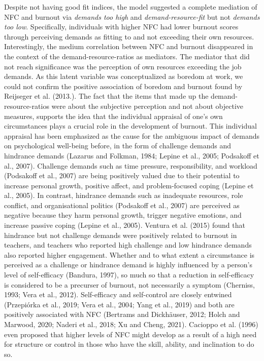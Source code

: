 \documentclass[
  english,
  man,floatsintext]{apa6}
\begin{document}
Despite not having good fit indices, the model suggested a complete mediation of NFC and burnout via \emph{demands too high} and \emph{demand-resource-fit} but not \emph{demands too low}.
Specifically, individuals with higher NFC had lower burnout scores through perceiving demands as fitting to and not exceeding their own resources.
Interestingly, the medium correlation between NFC and burnout disappeared in the context of the demand-resource-ratios as mediators.
The mediator that did not reach significance was the perception of own resources exceeding the job demands.
As this latent variable was conceptualized as boredom at work, we could not confirm the positive association of boredom and burnout found by Reijseger et al. (2013.).
The fact that the items that made up the demand-resource-ratios were about the subjective perception and not about objective measures, supports the idea that the individual appraisal of one's own circumstances plays a crucial role in the development of burnout.
This individual appraisal has been emphasized as the cause for the ambiguous impact of demands on psychological well-being before, in the form of challenge demands and hindrance demands (Lazarus and Folkman, 1984; Lepine et al., 2005; Podsakoff et al., 2007).
Challenge demands such as time pressure, responsibility, and workload (Podsakoff et al., 2007) are being positively valued due to their potential to increase personal growth, positive affect, and problem-focused coping (Lepine et al., 2005).
In contrast, hindrance demands such as inadequate resources, role conflict, and organisational politics (Podsakoff et al., 2007) are perceived as negative because they harm personal growth, trigger negative emotions, and increase passive coping (Lepine et al., 2005).
Ventura et al. (2015) found that hindrance but not challenge demands were positively related to burnout in teachers, and teachers who reported high challenge and low hindrance demands also reported higher engagement.
Whether and to what extent a circumstance is perceived as a challenge or hindrance demand is highly influenced by a person's level of self-efficacy (Bandura, 1997), so much so that a reduction in self-efficacy is considered to be a precurser of burnout, not necessarily a symptom (Cherniss, 1993; Vera et al., 2012).
Self-efficacy and self-control are closely entwined (Przepiórka et al., 2019; Vera et al., 2004; Yang et al., 2019) and both are positively associated with NFC (Bertrams and Dickhäuser, 2012; Holch and Marwood, 2020; Naderi et al., 2018; Xu and Cheng, 2021).
Cacioppo et al. (1996) even proposed that higher levels of NFC might develop as a result of a high need for structure or control in those who have the skill, ability, and inclination to do so.
\end{document}
